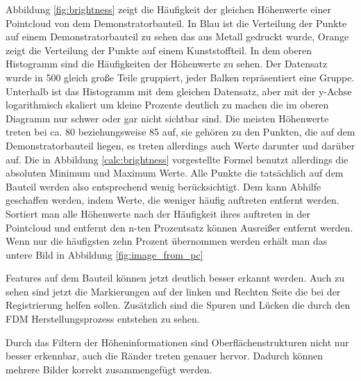 Abbildung \ref*{fig:brightness} zeigt die Häufigkeit der gleichen Höhenwerte einer
Pointcloud von dem Demonstratorbauteil. In Blau ist die Verteilung der Punkte auf 
einem Demonstratorbauteil zu sehen das aus Metall gedruckt wurde, Orange zeigt die 
Verteilung der Punkte auf einem Kunststoffteil.
In dem oberen Histogramm 
sind die Häufigkeiten der Höhenwerte zu sehen. Der Datensatz wurde in 500 gleich große
Teile gruppiert, jeder Balken repräsentiert eine Gruppe.
Unterhalb ist das Histogramm mit dem gleichen Datensatz, aber mit der y-Achse 
logarithmisch skaliert um kleine Prozente deutlich zu machen die im
oberen Diagramm nur schwer oder gar nicht sichtbar sind. 
Die meisten Höhenwerte treten bei ca. 80 beziehungsweise 85 auf, 
sie gehören zu den Punkten, die auf dem Demonstratorbauteil liegen, 
es treten allerdings auch Werte darunter und darüber auf. 
Die in Abbildung \ref*{calc:brightness} vorgestellte Formel benutzt allerdings 
die absoluten Minimum und Maximum Werte.
Alle Punkte die tatsächlich auf dem Bauteil werden also entsprechend wenig
berücksichtigt. Dem kann Abhilfe geschaffen werden, indem Werte, die weniger häufig 
auftreten entfernt werden. Sortiert man alle Höhenwerte nach der Häufigkeit ihres 
auftreten in der Pointcloud und entfernt den n-ten Prozentsatz können Ausreißer 
entfernt werden. Wenn nur die häufigsten zehn Prozent übernommen werden erhält man 
das untere Bild in Abbildung \ref{fig:image_from_pc}

Features auf dem Bauteil können jetzt deutlich besser erkannt werden. Auch zu sehen
sind jetzt die Markierungen auf der linken und Rechten Seite die bei der Registrierung
helfen sollen. Zusätzlich sind die Spuren und Lücken die durch den FDM 
Herstellungsprozess entstehen zu sehen.

Durch das Filtern der Höheninformationen sind Oberflächenstrukturen nicht nur besser
erkennbar, auch die Ränder treten genauer hervor. 
Dadurch können mehrere Bilder korrekt zusammengefügt werden.

